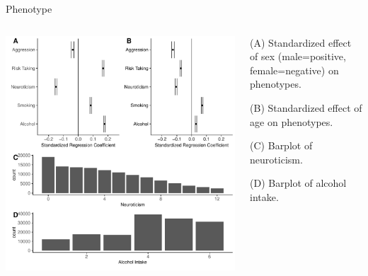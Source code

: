 \documentclass{beamer}
\begin{document}
\begin{frame}[t]{Phenotype}
  \begin{center}

    \begin{columns}
      \begin{column}{0.5\textwidth}
        \includegraphics[width=1\linewidth]{../ukb_assoc/figure/phenotype/descriptives_plots.pdf}
      \end{column}
      \begin{column}{0.5\textwidth}
        \begin{itemize}
          {\small
          \item (A) Standardized effect of sex (male=positive, female=negative) on phenotypes. 
          \item (B) Standardized effect of age on phenotypes.
          \item (C) Barplot of neuroticism.
          \item (D) Barplot of alcohol intake.
          }
      \end{itemize}
    \end{column}
  \end{columns}
\end{center}
\end{frame}
\end{document}
